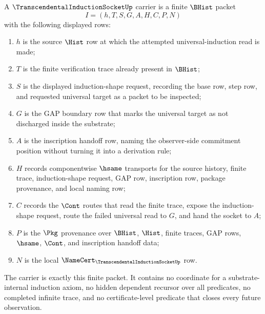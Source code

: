 \begin{definition}
\label{def:transcendental-induction-socket-carrier}
A $\TranscendentalInductionSocketUp$ carrier is a finite $\BHist$ packet
$$
I=(h,T,S,G,A,H,C,P,N)
$$
with the following displayed rows:
\begin{enumerate}
\item $h$ is the source $\Hist$ row at which the attempted universal-induction read is made;
\item $T$ is the finite verification trace already present in $\BHist$;
\item $S$ is the displayed induction-shape request, recording the base row, step row, and requested universal target as a packet to be inspected;
\item $G$ is the GAP boundary row that marks the universal target as not discharged inside the substrate;
\item $A$ is the inscription handoff row, naming the observer-side commitment position without turning it into a derivation rule;
\item $H$ records componentwise $\hsame$ transports for the source history, finite trace, induction-shape request, GAP row, inscription row, package provenance, and local naming row;
\item $C$ records the $\Cont$ routes that read the finite trace, expose the induction-shape request, route the failed universal read to $G$, and hand the socket to $A$;
\item $P$ is the $\Pkg$ provenance over $\BHist$, $\Hist$, finite traces, GAP rows, $\hsame$, $\Cont$, and inscription handoff data;
\item $N$ is the local $\NameCert_{\TranscendentalInductionSocketUp}$ row.
\end{enumerate}
The carrier is exactly this finite packet. It contains no coordinate for a substrate-internal induction axiom, no hidden dependent recursor over all predicates, no completed infinite trace, and no certificate-level predicate that closes every future observation.
\end{definition}

